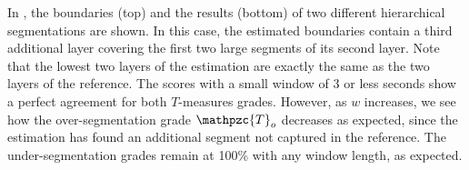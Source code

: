 \documentclass{article}
\def\shag{\ensuremath{\mathpzc{T}}}
\begin{document}

In , the boundaries (top) and the results (bottom) of two different hierarchical segmentations are shown.
In this case, the estimated boundaries contain a third additional layer covering the first two large segments of its second layer.
Note that the lowest two layers of the estimation are exactly the same as the two layers of the reference.
The scores with a small window of 3 or less seconds show a perfect agreement for both $T$-measures grades.
However, as $w$ increases, we see how the over-segmentation grade $\shag_o$ decreases as expected, since the
estimation has found an additional segment not captured in the reference.
The under-segmentation grades remain at 100\% with any window length, as expected.
\end{document}
